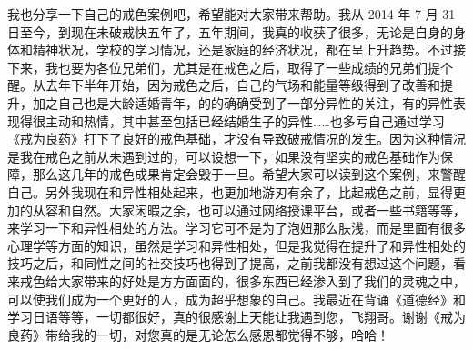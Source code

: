 \begin{case}
    我也分享一下自己的戒色案例吧，希望能对大家带来帮助。我从 2014 年 7 月 31 日至今，到现在未破戒快五年了，五年期间，我真的收获了很多，无论是自身的身体和精神状况，学校的学习情况，还是家庭的经济状况，都在呈上升趋势。不过接下来，我也要为各位兄弟们，尤其是在戒色之后，取得了一些成绩的兄弟们提个醒。从去年下半年开始，因为戒色之后，自己的气场和能量等级得到了改善和提升，加之自己也是大龄适婚青年，的的确确受到了一部分异性的关注，有的异性表现得很主动和热情，其中甚至包括已经结婚生子的异性……也多亏自己通过学习《戒为良药》打下了良好的戒色基础，才没有导致破戒情况的发生。因为这种情况是我在戒色之前从未遇到过的，可以设想一下，如果没有坚实的戒色基础作为保障，那么这几年的戒色成果肯定会毁于一旦。希望大家可以读到这个案例，来警醒自己。另外我现在和异性相处起来，也更加地游刃有余了，比起戒色之前，显得更加的从容和自然。大家闲暇之余，也可以通过网络授课平台，或者一些书籍等等，来学习一下和异性相处的方法。学习它可不是为了泡妞那么肤浅，而是里面有很多心理学等方面的知识，虽然是学习和异性相处，但是我觉得在提升了和异性相处的技巧之后，和同性之间的社交技巧也得到了提高，之前我都没有想过这个问题，看来戒色给大家带来的好处是方方面面的，很多东西已经渗入到了我们的灵魂之中，可以使我们成为一个更好的人，成为超乎想象的自己。我最近在背诵《道德经》和学习日语等等，一切都很好，真的很感谢上天能让我遇到您，飞翔哥。谢谢《戒为良药》带给我的一切，对您真的是无论怎么感恩都觉得不够，哈哈！


\end{case}
